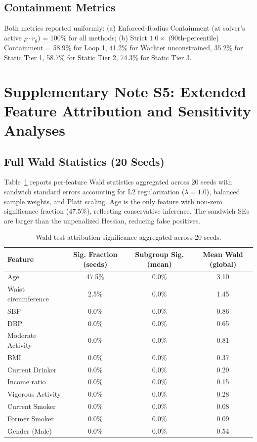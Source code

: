 \documentclass[11pt,a4paper]{article}
\theoremstyle{plain}
\begin{document}
\subsection{Containment Metrics}

Both metrics reported uniformly: (a) Enforced-Radius Containment (at solver's active $\rho \cdot r_g$) = 100\% for all methods; (b) Strict $1.0\times$ (90th-percentile) Containment = 58.9\% for Loop 1, 41.2\% for Wachter unconstrained, 35.2\% for Static Tier 1, 58.7\% for Static Tier 2, 74.3\% for Static Tier 3.

\section{Supplementary Note S5: Extended Feature Attribution and Sensitivity Analyses}
\label{sec:attr_ext}

\subsection{Full Wald Statistics (20 Seeds)}

Table~\ref{tab:full_attribution} reports per-feature Wald statistics aggregated across 20 seeds with sandwich standard errors accounting for L2 regularization ($\lambda=1.0$), balanced sample weights, and Platt scaling. Age is the only feature with non-zero significance fraction (47.5\%), reflecting conservative inference. The sandwich SEs are larger than the unpenalized Hessian, reducing false positives.

\begin{table}[htbp]
\centering
\caption{Wald-test attribution significance aggregated across 20 seeds.}
\label{tab:full_attribution}
\begin{tabular}{lccc}
\toprule
Feature & Sig. Fraction (seeds) & Subgroup Sig. (mean) & Mean Wald (global) \\
\midrule
Age & 47.5\% & 0.0\% & 3.10 \\
Waist circumference & 2.5\% & 0.0\% & 1.45 \\
SBP & 0.0\% & 0.0\% & 0.86 \\
DBP & 0.0\% & 0.0\% & 0.65 \\
Moderate Activity & 0.0\% & 0.0\% & 0.81 \\
BMI & 0.0\% & 0.0\% & 0.37 \\
Current Drinker & 0.0\% & 0.0\% & 0.29 \\
Income ratio & 0.0\% & 0.0\% & 0.15 \\
Vigorous Activity & 0.0\% & 0.0\% & 0.28 \\
Current Smoker & 0.0\% & 0.0\% & 0.08 \\
Former Smoker & 0.0\% & 0.0\% & 0.09 \\
Gender (Male) & 0.0\% & 0.0\% & 0.54 \\
\bottomrule
\end{tabular}
\end{table}
\end{document}
